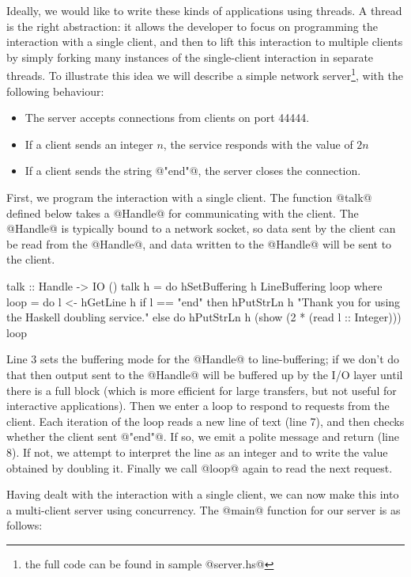 Ideally, we would like to write these kinds of applications using
threads.  A thread is the right abstraction: it allows the developer
to focus on programming the interaction with a single client, and then
to lift this interaction to multiple clients by simply forking many
instances of the single-client interaction in separate threads.  To
illustrate this idea we will describe a simple network
server\footnote{the full code can be found in sample @server.hs@},
with the following behaviour:

\begin{itemize}
\item The server accepts connections from clients on port 44444.
\item If a client sends an integer $n$, the service responds with the value of
  $2n$
\item If a client sends the string @"end"@, the server closes the
  connection.
\end{itemize}

First, we program the interaction with a single client.  The function
@talk@ defined below takes a @Handle@ for communicating with the
client.  The @Handle@ is typically bound to a network socket, so data
sent by the client can be read from the @Handle@, and data written to
the @Handle@ will be sent to the client.

\begin{numhaskell}
talk :: Handle -> IO ()
talk h = do
  hSetBuffering h LineBuffering
  loop
 where
  loop = do
    l <- hGetLine h
    if l == "end"
       then hPutStrLn h "Thank you for using the Haskell doubling service."
       else do hPutStrLn h (show (2 * (read l :: Integer)))
               loop
\end{numhaskell}

\noindent Line 3 sets the buffering mode for the @Handle@ to
line-buffering; if we don't do that then output sent to the @Handle@
will be buffered up by the I/O layer until there is a full block
(which is more efficient for large transfers, but not useful for
interactive applications).  Then we enter a loop to respond to
requests from the client.  Each iteration of the loop reads a new line
of text (line 7), and then checks whether the client sent @"end"@.  If
so, we emit a polite message and return (line 8).  If not, we attempt
to interpret the line as an integer and to write the value obtained by
doubling it.  Finally we call @loop@ again to read the next request.

Having dealt with the interaction with a single client, we can now
make this into a multi-client server using concurrency.  The @main@
function for our server is as follows:

